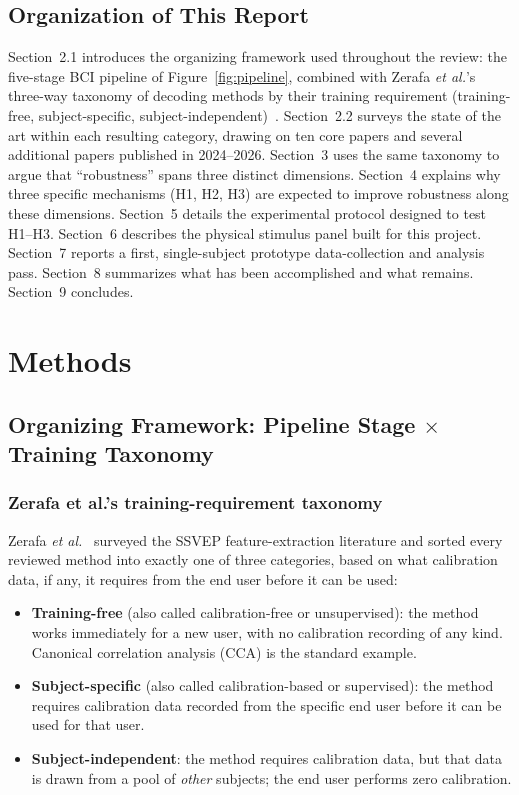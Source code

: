 \documentclass[11pt]{article}
\begin{document}
\subsection{Organization of This Report}

Section~2.1 introduces the organizing framework used throughout the review: the five-stage BCI pipeline of Figure~\ref{fig:pipeline}, combined with Zerafa \textit{et al.}'s three-way taxonomy of decoding methods by their training requirement (training-free, subject-specific, subject-independent)~\cite{zerafa2018train}. Section~2.2 surveys the state of the art within each resulting category, drawing on ten core papers and several additional papers published in 2024--2026. Section~3 uses the same taxonomy to argue that ``robustness'' spans three distinct dimensions. Section~4 explains why three specific mechanisms (H1, H2, H3) are expected to improve robustness along these dimensions. Section~5 details the experimental protocol designed to test H1--H3. Section~6 describes the physical stimulus panel built for this project. Section~7 reports a first, single-subject prototype data-collection and analysis pass. Section~8 summarizes what has been accomplished and what remains. Section~9 concludes.

\section{Methods}

\subsection{Organizing Framework: Pipeline Stage $\times$ Training Taxonomy}
\label{sec:framework}

\subsubsection{Zerafa et al.'s training-requirement taxonomy}

Zerafa \textit{et al.}~\cite{zerafa2018train} surveyed the SSVEP feature-extraction literature and sorted every reviewed method into exactly one of three categories, based on what calibration data, if any, it requires from the end user before it can be used:

\begin{itemize}
  \item \textbf{Training-free} (also called calibration-free or unsupervised): the method works immediately for a new user, with no calibration recording of any kind. Canonical correlation analysis (CCA) is the standard example.
  \item \textbf{Subject-specific} (also called calibration-based or supervised): the method requires calibration data recorded from the specific end user before it can be used for that user.
  \item \textbf{Subject-independent}: the method requires calibration data, but that data is drawn from a pool of \emph{other} subjects; the end user performs zero calibration.
\end{itemize}
\end{document}
